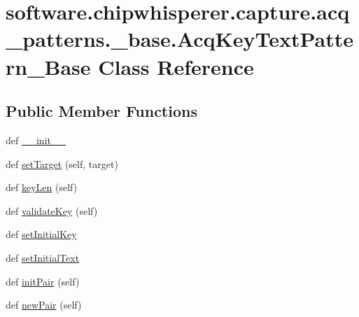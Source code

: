 \hypertarget{classsoftware_1_1chipwhisperer_1_1capture_1_1acq__patterns_1_1__base_1_1AcqKeyTextPattern__Base}{}\section{software.\+chipwhisperer.\+capture.\+acq\+\_\+patterns.\+\_\+base.\+Acq\+Key\+Text\+Pattern\+\_\+\+Base Class Reference}
\label{classsoftware_1_1chipwhisperer_1_1capture_1_1acq__patterns_1_1__base_1_1AcqKeyTextPattern__Base}
\subsection*{Public Member Functions}
\begin{DoxyCompactItemize}
\item 
def \hyperlink{classsoftware_1_1chipwhisperer_1_1capture_1_1acq__patterns_1_1__base_1_1AcqKeyTextPattern__Base_a2f8ebdfb95139440a5103cafc8bac597}{\+\_\+\+\_\+init\+\_\+\+\_\+}
\item 
def \hyperlink{classsoftware_1_1chipwhisperer_1_1capture_1_1acq__patterns_1_1__base_1_1AcqKeyTextPattern__Base_a0677fe0a6c1fa8267187428306088798}{set\+Target} (self, target)
\item 
def \hyperlink{classsoftware_1_1chipwhisperer_1_1capture_1_1acq__patterns_1_1__base_1_1AcqKeyTextPattern__Base_aca07626bcb529c79690e0ceb6b53e5f8}{key\+Len} (self)
\item 
def \hyperlink{classsoftware_1_1chipwhisperer_1_1capture_1_1acq__patterns_1_1__base_1_1AcqKeyTextPattern__Base_abd4523d4cfd96edce8f06a767e394cb7}{validate\+Key} (self)
\item 
def \hyperlink{classsoftware_1_1chipwhisperer_1_1capture_1_1acq__patterns_1_1__base_1_1AcqKeyTextPattern__Base_ace5f9780e516ef27ca78f1d53380b732}{set\+Initial\+Key}
\item 
def \hyperlink{classsoftware_1_1chipwhisperer_1_1capture_1_1acq__patterns_1_1__base_1_1AcqKeyTextPattern__Base_acd64ada96e316cd1ffaa1735a9510868}{set\+Initial\+Text}
\item 
def \hyperlink{classsoftware_1_1chipwhisperer_1_1capture_1_1acq__patterns_1_1__base_1_1AcqKeyTextPattern__Base_a0a439fb8cf0d59e2f24316562b88e1b0}{init\+Pair} (self)
\item 
def \hyperlink{classsoftware_1_1chipwhisperer_1_1capture_1_1acq__patterns_1_1__base_1_1AcqKeyTextPattern__Base_ae23823aad9ae23145a9074eb5819acaf}{new\+Pair} (self)
\end{DoxyCompactItemize}


